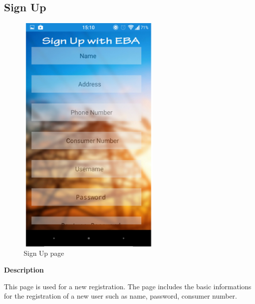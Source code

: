 \documentclass[12pt,a4paper,oneside]{report}
\begin{document}
\subsection{Sign Up}
\begin{figure}[H]
	\begin{center}
		\includegraphics[width=7cm,height=12cm]{signupss.jpg}
			\caption{Sign Up page}
			\label{Sign Up page}
	\end{center}
\end{figure}
\textbf{Description}
\par This page is used for a new registration. The page includes the basic informations for the registration of a new user such as name, password, consumer number.
\newpage
\end{document}
